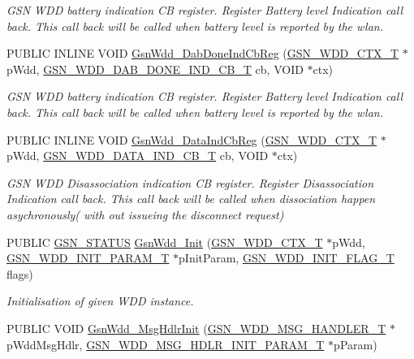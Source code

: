 \begin{DoxyCompactItemize}
\begin{DoxyCompactList}\small\item\em GSN WDD battery indication CB register. Register Battery level Indication call back. This call back will be called when battery level is reported by the wlan. \end{DoxyCompactList}\item 
PUBLIC INLINE VOID \hyperlink{a00677_ga689c811b864189de9e85558136b7587d}{GsnWdd\_\-DabDoneIndCbReg} (\hyperlink{a00108}{GSN\_\-WDD\_\-CTX\_\-T} $\ast$pWdd, \hyperlink{a00677_ga609ae39dc432b9821b764bea4957369a}{GSN\_\-WDD\_\-DAB\_\-DONE\_\-IND\_\-CB\_\-T} cb, VOID $\ast$ctx)
\begin{DoxyCompactList}\small\item\em GSN WDD battery indication CB register. Register Battery level Indication call back. This call back will be called when battery level is reported by the wlan. \end{DoxyCompactList}\item 
PUBLIC INLINE VOID \hyperlink{a00677_gafb4865d7da2c56855e31130d2d3b5f31}{GsnWdd\_\-DataIndCbReg} (\hyperlink{a00108}{GSN\_\-WDD\_\-CTX\_\-T} $\ast$pWdd, \hyperlink{a00603_a6ba5be1c4251a77b2a642319af4b696b}{GSN\_\-WDD\_\-DATA\_\-IND\_\-CB\_\-T} cb, VOID $\ast$ctx)
\begin{DoxyCompactList}\small\item\em GSN WDD Disassociation indication CB register. Register Disassociation Indication call back. This call back will be called when dissociation happen asychronously( with out issueing the disconnect request) \end{DoxyCompactList}\item 
PUBLIC \hyperlink{a00660_gada5951904ac6110b1fa95e51a9ddc217}{GSN\_\-STATUS} \hyperlink{a00677_ga531570f995c4706e4dfc0a3b19ddc634}{GsnWdd\_\-Init} (\hyperlink{a00108}{GSN\_\-WDD\_\-CTX\_\-T} $\ast$pWdd, \hyperlink{a00276}{GSN\_\-WDD\_\-INIT\_\-PARAM\_\-T} $\ast$pInitParam, \hyperlink{a00603_ae0e55b26e7cfed5cc849b360e24289e3}{GSN\_\-WDD\_\-INIT\_\-FLAG\_\-T} flags)
\begin{DoxyCompactList}\small\item\em Initialisation of given WDD instance. \end{DoxyCompactList}\item 
PUBLIC VOID \hyperlink{a00677_gad16cf4ccb5b16d0a9bd6a9b18384c8d9}{GsnWdd\_\-MsgHdlrInit} (\hyperlink{a00279}{GSN\_\-WDD\_\-MSG\_\-HANDLER\_\-T} $\ast$pWddMsgHdlr, \hyperlink{a00280}{GSN\_\-WDD\_\-MSG\_\-HDLR\_\-INIT\_\-PARAM\_\-T} $\ast$pParam)

\end{DoxyCompactItemize}
